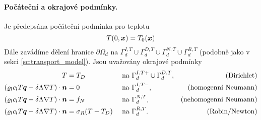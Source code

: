 \paragraph{Počáteční a okrajové podmínky.}
Je předepsána počáteční podmínka pro teplotu
$$ T(0,\vc x) = \hyperA{HeatTransfer-DG-Data::init-temperature}{T_0}(\vc x) $$
Dále zavádíme dělení hranice $\partial\Omega_d$ na $\Gamma_d^{I,T}\cup\Gamma_d^{D,T}\cup\Gamma_d^{N,T}\cup\Gamma_d^{R,T}$ (podobně jako v sekci \ref{sc:transport_model}).
Jsou uvažovány okrajové podmínky
\begin{align*}
T &= \hyperA{HeatTransfer-DG-Data::bc-temperature}{T_D} &&\mbox{ na }\Gamma_d^{I,T+}\cup\Gamma_d^{D,T}, &\mbox{(Dirichlet)}\\
\left(\varrho_l c_l T \vc q - \delta\Lambda\nabla T\right)\cdot\vc n &= 0 &&\mbox{ na }\Gamma_d^{I,T-}, &\mbox{(homogenní Neumann)}\\
\left(\varrho_l c_l T \vc q - \delta\Lambda\nabla T\right)\cdot\vc n &= \hyperA{HeatTransfer-DG-Data::bc-flux}{f_N} &&\mbox{ na }\Gamma_d^{N,T}, &\mbox{(nehomogenní Neumann)}\\
\left(\varrho_l c_l T \vc q - \delta\Lambda\nabla T\right)\cdot\vc n &= \hyperA{HeatTransfer-DG-Data::bc-robin-sigma}{\sigma_R}(T-\hyperA{HeatTransfer-DG-Data::bc-temperature}{T_D}) &&\mbox{ na }\Gamma_d^{R,T}. &\mbox{(Robin/Newton)}
\end{align*}






